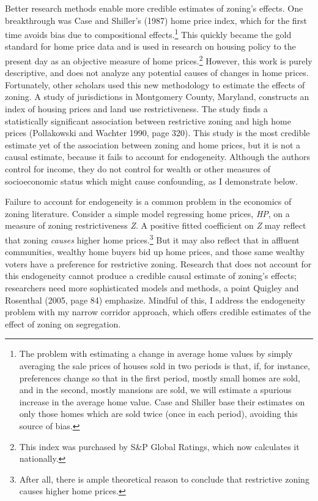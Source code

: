 \documentclass[11pt]{article}
\begin{document}
Better research methods enable more credible estimates of zoning’s effects. One breakthrough was Case and Shiller’s (1987) home price index, which for the first time avoids bias due to compositional effects.\footnote{The problem with estimating a change in average home values by simply averaging the sale prices of houses sold in two periods is that, if, for instance, preferences change so that in the first period, mostly small homes are sold, and in the second, mostly mansions are sold, we will estimate a spurious increase in the average home value. Case and Shiller base their estimates on only those homes which are sold twice (once in each period), avoiding this source of bias.} This quickly became the gold standard for home price data and is used in research on housing policy to the present day as an objective measure of home prices.\footnote{This index was purchased by S\&P Global Ratings, which now calculates it nationally.} However, this work is purely descriptive, and does not analyze any potential causes of changes in home prices. Fortunately, other scholars used this new methodology to estimate the effects of zoning. A study of jurisdictions in Montgomery County, Maryland, constructs an index of housing prices and land use restrictiveness. The study finds a statistically significant association between restrictive zoning and high home prices (Pollakowski and Wachter 1990, page 320). This study is the most credible estimate yet of the association between zoning and home prices, but it is not a causal estimate, because it fails to account for endogeneity. Although the authors control for income, they do not control for wealth or other measures of socioeconomic status which might cause confounding, as I demonstrate below.

Failure to account for endogeneity is a common problem in the economics of zoning literature. Consider a simple model regressing home prices, \textit{HP}, on a measure of zoning restrictiveness \textit{Z}. A positive fitted coefficient on \textit{Z} may reflect that zoning \textit{causes} higher home prices.\footnote{After all, there is ample theoretical reason to conclude that restrictive zoning causes higher home prices.} But it may also reflect that in affluent communities, wealthy home buyers bid up home prices, and those same wealthy voters have a preference for restrictive zoning. Research that does not account for this endogeneity cannot produce a credible causal estimate of zoning’s effects; researchers need more sophisticated models and methods, a point Quigley and Rosenthal (2005, page 84) emphasize. Mindful of this, I address the endogeneity problem with my narrow corridor approach, which offers credible estimates of the effect of zoning on segregation.
\end{document}
